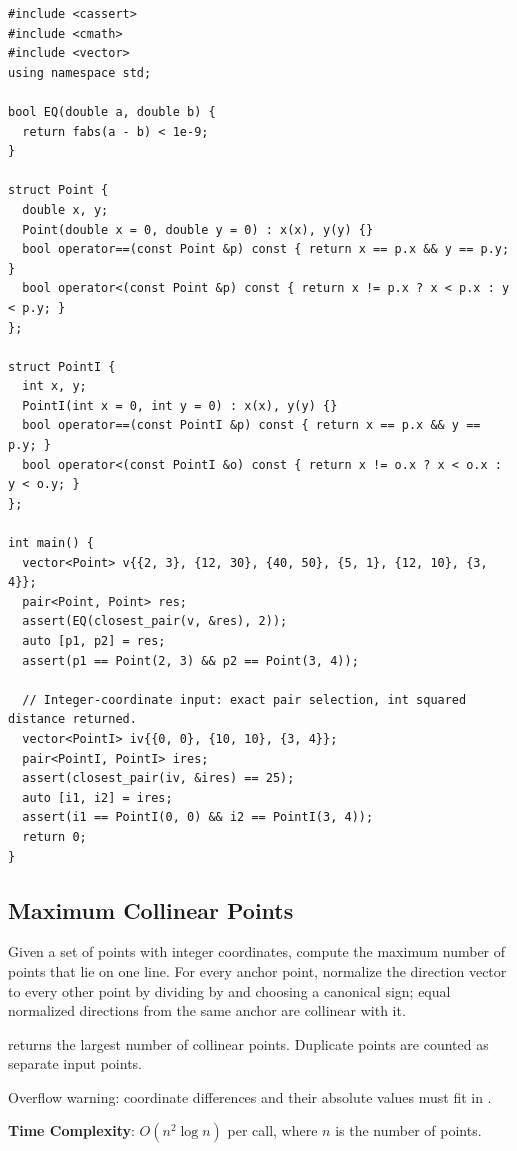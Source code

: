 \begin{lstlisting}[style=cpp]
#include <cassert>
#include <cmath>
#include <vector>
using namespace std;

bool EQ(double a, double b) {
  return fabs(a - b) < 1e-9;
}

struct Point {
  double x, y;
  Point(double x = 0, double y = 0) : x(x), y(y) {}
  bool operator==(const Point &p) const { return x == p.x && y == p.y; }
  bool operator<(const Point &p) const { return x != p.x ? x < p.x : y < p.y; }
};

struct PointI {
  int x, y;
  PointI(int x = 0, int y = 0) : x(x), y(y) {}
  bool operator==(const PointI &p) const { return x == p.x && y == p.y; }
  bool operator<(const PointI &o) const { return x != o.x ? x < o.x : y < o.y; }
};

int main() {
  vector<Point> v{{2, 3}, {12, 30}, {40, 50}, {5, 1}, {12, 10}, {3, 4}};
  pair<Point, Point> res;
  assert(EQ(closest_pair(v, &res), 2));
  auto [p1, p2] = res;
  assert(p1 == Point(2, 3) && p2 == Point(3, 4));

  // Integer-coordinate input: exact pair selection, int squared distance returned.
  vector<PointI> iv{{0, 0}, {10, 10}, {3, 4}};
  pair<PointI, PointI> ires;
  assert(closest_pair(iv, &ires) == 25);
  auto [i1, i2] = ires;
  assert(i1 == PointI(0, 0) && i2 == PointI(3, 4));
  return 0;
}
\end{lstlisting}
\subsection{Maximum Collinear Points}
\label{sec:7.3.7}
Given a set of points with integer coordinates, compute the maximum number of points that lie on one line. For every anchor point, normalize the direction vector to every other point by dividing by  and choosing a canonical sign; equal normalized directions from the same anchor are collinear with it.

\begin{compactitem}
  \item {} returns the largest number of collinear points. Duplicate points are counted as separate input points.
\end{compactitem}

Overflow warning: coordinate differences and their absolute values must fit in .

\textbf{Time Complexity}: $O(n^{2} \log n)$ per call, where $n$ is the number of points.

